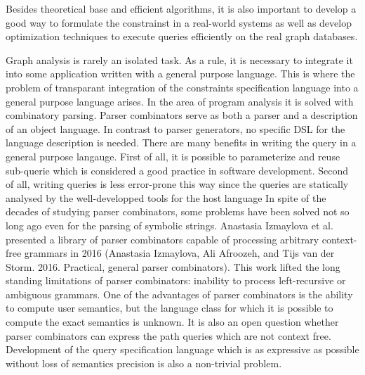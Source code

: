 \documentclass[12pt]{article}  %
\theoremstyle{remark}
\begin{document}
Besides theoretical base and efficient algorithms, it is also important to develop a good way to formulate the constrainst in a real-world systems as well as develop optimization techniques to execute queries efficiently on the real graph databases.

Graph analysis is rarely an isolated task.
As a rule, it is necessary to integrate it into some application written with a general purpose language.
This is where the problem of transparant integration of the constraints specification language into a general purpose language arises.
In the area of program analysis it is solved with combinatory parsing.
Parser combinators serve as both a parser and a description of an object language.
In contrast to parser generators, no specific DSL for the language description is needed.
There are many benefits in writing the query in a general purpose langauge.
First of all, it is possible to parameterize and reuse sub-querie which is considered a good practice in software development.
Second of all, writing queries is less error-prone this way since the queries are statically analysed by the well-developped tools for the host language
In spite of the decades of studying parser combinators, some problems have been solved not so long ago even for the parsing of symbolic strings.
Anastasia Izmaylova et al. presented a library of parser combinators capable of processing arbitrary context-free grammars in 2016 (Anastasia Izmaylova, Ali Afroozeh, and Tijs van der Storm. 2016. Practical, general parser combinators).
This work lifted the long standing limitations of parser combinators: inability to process left-recursive or ambiguous grammars.
One of the advantages of parser combinators is the ability to compute user semantics, but the language class for which it is possible to compute the exact semantics is unknown.
It is also an open question whether parser combinators can express the path queries which are not context free.
Development of the query specification language which is as expressive as possible without loss of semantics precision is also a non-trivial problem.
\end{document}
